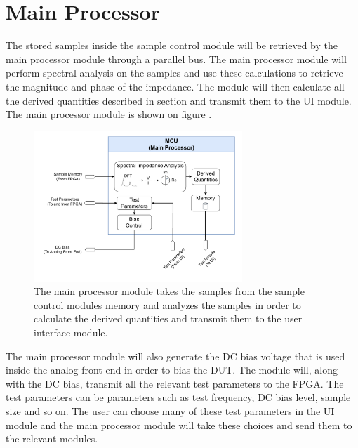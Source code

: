 \section{Main Processor} \label{sec:MainProcessor}

The stored samples inside the sample control module will be retrieved by the main processor module through a parallel bus. The main processor module will perform spectral analysis on the samples and use these calculations to retrieve the magnitude and phase of the impedance. The module will then calculate all the derived quantities described in section  and transmit them to the UI module. The main processor module is shown on figure .

\begin{figure}[H]
    \centering
    \includegraphics[clip, trim=18 0 18 0,width=0.70\textwidth]{Sections/6_SystemArchitecture/Figures/MCU.pdf}
    \caption{The main processor module takes the samples from the sample control modules memory and analyzes the samples in order to calculate the derived quantities and transmit them to the user interface module.}
    \label{fig_6_4_MainprocessorModule}
\end{figure}

The main processor module will also generate the DC bias voltage that is used inside the analog front end in order to bias the DUT. The module will, along with the DC bias, transmit all the relevant test parameters to the FPGA. The test parameters can be parameters such as test frequency, DC bias level, sample size and so on. The user can choose many of these test parameters in the UI module and the main processor module will take these choices and send them to the relevant modules.
